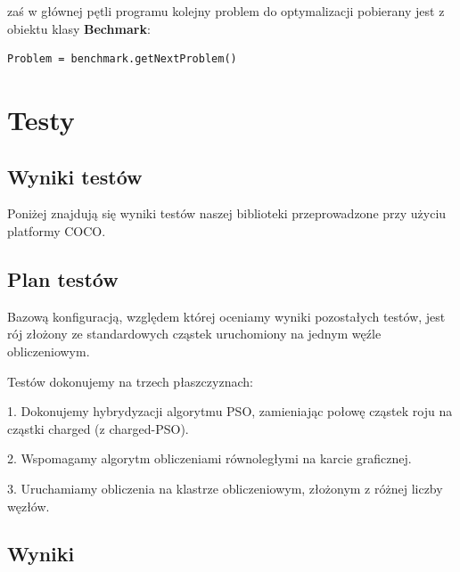 \documentclass[12pt, twoside, openany, abstract=on]{report}
\theoremstyle{definition}
\begin{document}
zaś w głównej pętli programu kolejny problem do optymalizacji pobierany jest z obiektu klasy \textbf{Bechmark}:

\begin{lstlisting}[frame=single]
Problem = benchmark.getNextProblem()
\end{lstlisting}


\chapter{Testy}

\section{Wyniki testów}
Poniżej znajdują się wyniki testów naszej biblioteki przeprowadzone przy użyciu platformy COCO. %


\section{Plan testów}
Bazową konfiguracją, względem której oceniamy wyniki pozostałych testów, jest rój złożony ze standardowych cząstek uruchomiony na jednym węźle obliczeniowym. 

Testów dokonujemy na trzech płaszczyznach:

1. Dokonujemy hybrydyzacji algorytmu PSO, zamieniając połowę cząstek roju na cząstki charged (z charged-PSO).

2. Wspomagamy algorytm obliczeniami równoległymi na karcie graficznej.

3. Uruchamiamy obliczenia na klastrze obliczeniowym, złożonym z różnej liczby węzłów.

\section{Wyniki}
\end{document}

